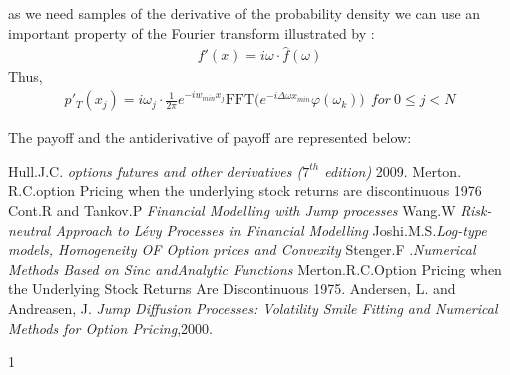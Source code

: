 \documentclass[12pt]{report}
\begin{document}
as we need samples of the derivative of the probability density we can use an important property of the Fourier transform illustrated by :
\begin{gather*}
f'(x)= i \omega \cdot \hat{f}(\omega)
\end{gather*}
Thus, 
\begin{gather}
p'_T(x_j)= i \omega_j \cdot   \frac{1}{2 \pi} e^{- iw_{min} x_j} \text{FFT}\big ( e^{-i \Delta\omega x_{min} } \varphi(\omega_k) \big) ~~for~ 0 \leqslant j < N
\end{gather}

The payoff and the antiderivative of payoff are represented below:

 \begin{thebibliography}{1}
 
   Hull.J.C. {\em options futures and other derivatives ($7^{th}$ edition)}  2009.
Merton. R.C.{option Pricing when the underlying stock returns are discontinuous} 1976
Cont.R and Tankov.P {\em Financial Modelling with Jump processes}
 Wang.W {\em Risk-neutral Approach to
Lévy Processes in Financial Modelling}
 Joshi.M.S.{\em Log-type models, Homogeneity OF Option prices and Convexity}
 Stenger.F .{\em Numerical Methods
Based on Sinc andAnalytic Functions}
 Merton.R.C.{Option Pricing when the Underlying Stock Returns Are Discontinuous} 1975.
  Andersen, L. and Andreasen, J. {\em Jump Diffusion Processes: Volatility Smile Fitting
and Numerical Methods for Option Pricing},2000.
 \end{thebibliography}{1}


 
\end{document}
